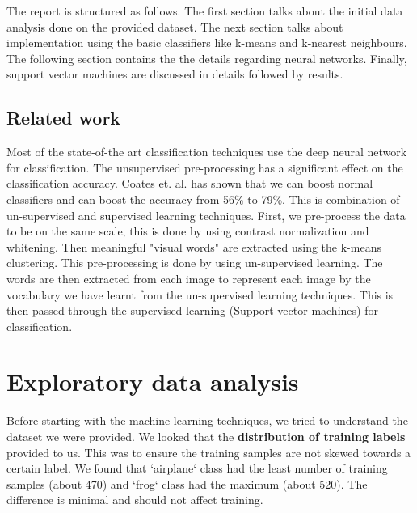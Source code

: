 \documentclass{article} %
\begin{document}
The report is structured as follows. The first section talks about the initial data analysis done on the provided dataset. The next section talks about implementation using the basic classifiers like k-means and k-nearest neighbours. The following section contains the the details regarding neural networks. Finally, support vector machines are discussed in details followed by results.

\subsection{Related work}
Most of the state-of-the art classification techniques use the deep neural network for classification. The unsupervised pre-processing has a significant effect on the classification accuracy. Coates et. al. \cite{andrew} has shown that we can boost normal classifiers and can boost the accuracy from 56\% to 79\%. This is combination of un-supervised and supervised learning techniques. First, we pre-process the data to be on the same scale, this is done by using contrast normalization and whitening. Then meaningful "visual words" \cite{visualwords} are extracted using the k-means clustering. This pre-processing is done by using un-supervised learning. The words are then extracted from each image to represent each image by the vocabulary we have learnt from the un-supervised learning techniques. This is then passed through the supervised learning (Support vector machines) for classification.



\section{Exploratory data analysis}
    Before starting with the machine learning techniques, we tried to understand the dataset we were provided. We looked that the \textbf{distribution of training labels} provided to us. This was to ensure the training samples are not skewed towards a certain label. We found that `airplane` class had the least number of training samples (about 470) and `frog` class had the maximum (about 520). The difference is minimal and should not affect training.
\end{document}
